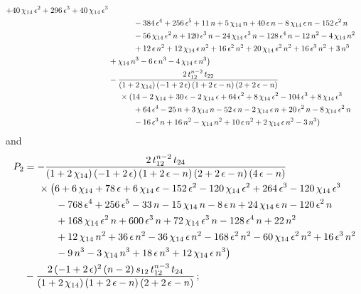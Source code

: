 \documentclass[aps,prd,preprint,groupedaddress,nofootinbib,showpacs,eqsecnum]{revtex4}
\def\eps{\epsilon}
\begin{document}
\begin{equation}
\begin{aligned}
+40\,\chi_{14}\,\eps^{2}+296\,\eps^{3}+40\,\chi_{14}\,\eps^{3}
\\ &\indentPA
-384\,\eps^{4}+256\,\eps^{5}+11\,n+5\,\chi_{14}\,n+40\,\eps\,n
-8\,\chi_{14}\,\eps\,n-152\,\eps^{2}\,n
\\ &\indentPA
-56\,\chi_{14}\,\eps^{2}\,n
+120\,\eps^{3}\,n-24\,\chi_{14}\,\eps^{3}\,n-128\,\eps^{4}\,n
-12\,n^{2}-4\,\chi_{14}\,n^{2}
\\ &\indentPA
+12\,\eps\,n^{2}
+12\,\chi_{14}\,\eps\,n^{2}+16\,\eps^{2}\,n^{2}
+20\,\chi_{14}\,\eps^{2}\,n^{2}+16\,\eps^{3}\,n^{2}+3\,n^{3}
\\ &
+\chi_{14}\,n^{3}-6\,\eps\,n^{3}-4\,\chi_{14}\,\eps\,n^{3}\bigr)
\\&-\frac{2\,t_{12}^{n-2}\,t_{22}}
{(1+2\,\chi_{14})\,(-1+2\,\eps)\,(1+2\,\eps-n)\,(2+2\,\eps-n)}
\\&\indentP(14-2\,\chi_{14}+30\,\eps-2\,\chi_{14}\,\eps+64\,\eps^{2}
+8\,\chi_{14}\,\eps^{2}-104\,\eps^{3}+8\,\chi_{14}\,\eps^{3}
\\ &\indentPA
+64\,\eps^{4}-25\,n+3\,\chi_{14}\,n-52\,\eps\,n
-2\,\chi_{14}\,\eps\,n+20\,\eps^{2}\,n-8\,\chi_{14}\,\eps^{2}\,n
\\ &\indentPA
-16\,\eps^{3}\,n+16\,n^{2}-\chi_{14}\,n^{2}+10\,\eps\,n^{2}
+2\,\chi_{14}\,\eps\,n^{2}-3\,n^{3})
\end{aligned}
\end{equation}
and
\begin{equation}
\begin{aligned}
P_2 &=
-\frac{2\,t_{12}^{n-2}\,t_{24}}
{(1+2\,\chi_{14})\,(-1+2\,\eps)\,(1+2\,\eps-n)\,(2+2\,\eps-n)\,(4\,\eps-n)}
\\&\indentP\bigl(6+6\,\chi_{14}+78\,\eps+6\,\chi_{14}\,\eps-152\,\eps^{2}
-120\,\chi_{14}\,\eps^{2}+264\,\eps^{3}-120\,\chi_{14}\,\eps^{3}
\\ &\indentPA
-768\,\eps^{4}+256\,\eps^{5}-33\,n-15\,\chi_{14}\,n-8\,\eps\,n
+24\,\chi_{14}\,\eps\,n-120\,\eps^{2}\,n
\\ &\indentPA
+168\,\chi_{14}\,\eps^{2}\,n+600\,\eps^{3}\,n
+72\,\chi_{14}\,\eps^{3}\,n-128\,\eps^{4}\,n+22\,n^{2}
\\ &\indentPA
+12\,\chi_{14}\,n^{2}+36\,\eps\,n^{2}-36\,\chi_{14}\,\eps\,n^{2}
-168\,\eps^{2}\,n^{2}-60\,\chi_{14}\,\eps^{2}\,n^{2}+16\,\eps^{3}\,n^{2}
\\ &\indentPA
-9\,n^{3}-3\,\chi_{14}\,n^{3}+18\,\eps\,n^{3}
+12\,\chi_{14}\,\eps\,n^{3}\bigr)
\\&-\frac{2\,(-1+2\,\eps)^{2}\,(n-2)\,s_{12}\,t_{12}^{n-3}\,t_{24}}
{(1+2\,\chi_{14})\,(1+2\,\eps-n)\,(2+2\,\eps-n)}
\,;
\end{aligned}
\end{equation}
\end{document}
